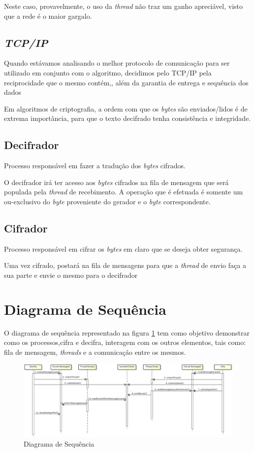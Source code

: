 Neste caso, provavelmente, o uso da \textit{thread} não traz um ganho apreciável, visto que a rede é o maior gargalo.

\subsection{\textit{TCP/IP}}

Quando estávamos analisando o melhor protocolo de comunicação para ser utilizado em conjunto com o algoritmo, decidimos pelo TCP/IP pela reciprocidade que o mesmo contém,, além da garantia de entrega e sequência dos dados 

Em algoritmos de criptografia, a ordem com que os \textit{bytes} são enviados/lidos é de extrema importância, para que o texto decifrado tenha consistência e integridade. 
\subsection{Decifrador}

Processo responsável em fazer a tradução dos \textit{bytes} cifrados. 

O decifrador irá ter acesso aos \textit{bytes} cifrados na fila de mensagem que será populada pela \textit{thread} de recebimento. A operação que é efetuada é somente um ou-exclusivo do \textit{byte} proveniente do gerador e o \textit{byte} correspondente.

\subsection{Cifrador}

Processo responsável em cifrar os \textit{bytes} em claro que se deseja obter segurança.

Uma vez cifrado, postará na fila de mensagens para que a \textit{thread} de envio faça a sua parte e envie o mesmo para o decifrador

\section{Diagrama de Sequência}

O diagrama de sequência representado na figura \ref{sequence-diagram} tem como objetivo demonstrar como os processos,cifra e  decifra, interagem com os outros elementos, tais como: fila de mensagem, \textit{threads} e a comunicação entre os mesmos. 

\begin{figure}[h]
	\centering
	\includegraphics[scale=0.5, angle = 90]{figuras/sequenceDiagram.eps}
	\caption{Diagrama de Sequência}
	\label{sequence-diagram}
\end{figure}


